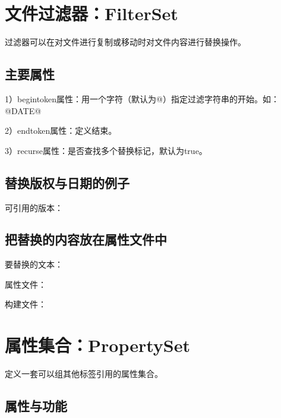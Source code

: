 	

\section{文件过滤器：FilterSet}
	
	过滤器可以在对文件进行复制或移动时对文件内容进行替换操作。

	\subsection{主要属性}

		1）begintoken属性：用一个字符（默认为@）指定过滤字符串的开始。如：@DATE@

		2）endtoken属性：定义结束。

		3）recurse属性：是否查找多个替换标记，默认为true。

	\subsection{替换版权与日期的例子}

		
		
		可引用的版本：

		
		
	\subsection{把替换的内容放在属性文件中}

		要替换的文本：

		

		属性文件：

		

		构建文件：

		
		
\section{属性集合：PropertySet}

	定义一套可以组其他标签引用的属性集合。

	\subsection{属性与功能}
		
